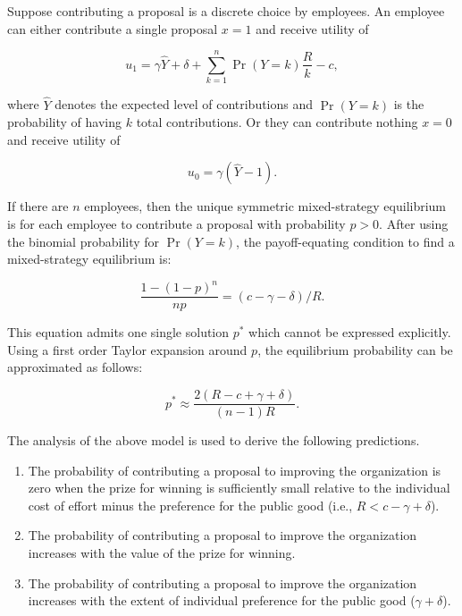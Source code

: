 \documentclass[11pt, titlepage]{article}
\begin{document}
Suppose contributing a proposal is a discrete choice by employees. An
employee can either contribute a single proposal \(x=1\) and receive
utility of

\begin{equation}
    u_1 = \gamma \hat Y + \delta + \sum_{k=1}^{n}\Pr(Y=k)\frac{R}{k}  - c, 
\end{equation}

where \(\hat Y\) denotes the expected level of contributions and
\(\Pr(Y=k)\) is the probability of having \(k\) total contributions. Or
they can contribute nothing \(x=0\) and receive utility of

\begin{equation}
  u_0 = \gamma (\hat Y - 1).
\end{equation}

If there are \(n\) employees, then the unique symmetric mixed-strategy
equilibrium is for each employee to contribute a proposal with
probability \(p>0\). After using the binomial probability for
\(\Pr(Y=k)\), the payoff-equating condition to find a mixed-strategy
equilibrium is:

\begin{equation} \label{eq: mixed-strategy}
  \frac{1- (1-p)^{n}}{n p} = (c- \gamma - \delta) / R.
\end{equation}

This equation admits one single solution \(p^*\) which cannot be
expressed explicitly. Using a first order Taylor expansion around \(p\),
the equilibrium probability can be approximated as follows:

\begin{equation} \label{eq: probability}
  p^*  \approx \frac{2 (R- c+\gamma +\delta )}{(n-1) R}. 
\end{equation}

The analysis of the above model is used to derive the following
predictions.

\begin{enumerate}
\def\labelenumi{\arabic{enumi})}
\item
  The probability of contributing a proposal to improving the
  organization is zero when the prize for winning is sufficiently small
  relative to the individual cost of effort minus the preference for the
  public good (i.e., \(R< c-\gamma +\delta\)).
\item
  The probability of contributing a proposal to improve the organization
  increases with the value of the prize for winning.
\item
  The probability of contributing a proposal to improve the organization
  increases with the extent of individual preference for the public good
  (\(\gamma+\delta\)).
\end{enumerate}
\end{document}
